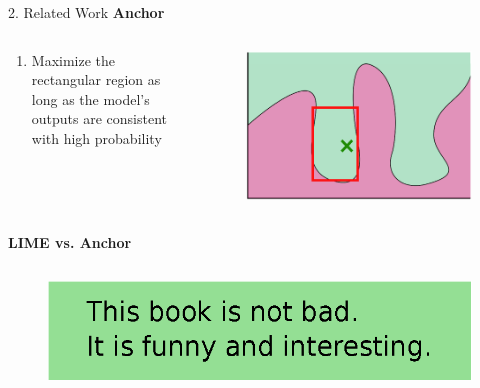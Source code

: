 \documentclass[unicode]{beamer}
\begin{document}
\begin{frame}
\begin{columns}[t]
\begin{column}{\lcol\linewidth}
\begin{block}{2. Related Work}
        \vspace{1.0em}
        \hspace{-1.0em}
        \textbf{Anchor}\cite{ribeiro2018anchors}
        \vspace{-0.5em}
        \begin{columns}
          \begin{column}{.55\textwidth}
            {
              \renewcommand{\leftmargini}{2.5em}
              \begin{enumerate}
                \item Maximize the rectangular region as long as
                      the model’s outputs are consistent with high probability
              \end{enumerate}
            }
          \end{column}
          \begin{column}{.45\textwidth}
            \begin{figure}
              \centering
              \includegraphics[width=.8\textwidth]{src/img/visual-anchor}
            \end{figure}
          \end{column}
        \end{columns}
        \vspace{1.0em}
        \hspace{-1.0em}
        \textbf{LIME vs. Anchor}
        \vspace{0.5em}
        \begin{columns}[]
          \begin{column}{0.4\textwidth}
            \begin{figure}
              \includegraphics[width=\textwidth]{src/img/example-instance}

\end{figure}
\end{column}
\end{columns}
\end{block}
\end{column}
\end{columns}
\end{frame}
\end{document}

